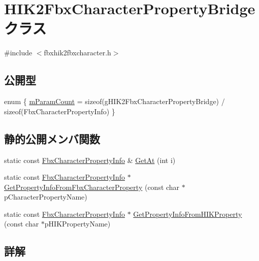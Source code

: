 \hypertarget{class_h_i_k2_fbx_character_property_bridge}{}\section{H\+I\+K2\+Fbx\+Character\+Property\+Bridge クラス}
\label{class_h_i_k2_fbx_character_property_bridge}


{\ttfamily \#include $<$fbxhik2fbxcharacter.\+h$>$}

\subsection*{公開型}
\begin{DoxyCompactItemize}
\item 
enum \{ \hyperlink{class_h_i_k2_fbx_character_property_bridge_ac10f28ca3e900cb0629889c0fd8bd87bac8e6c990d5975d6bf31634abcaff43f8}{m\+Param\+Count} = sizeof(g\+H\+I\+K2\+Fbx\+Character\+Property\+Bridge) / sizeof(Fbx\+Character\+Property\+Info)
 \}
\end{DoxyCompactItemize}
\subsection*{静的公開メンバ関数}
\begin{DoxyCompactItemize}
\item 
static const \hyperlink{class_fbx_character_property_info}{Fbx\+Character\+Property\+Info} \& \hyperlink{class_h_i_k2_fbx_character_property_bridge_ab3d905960717c287391f073b2e22c57f}{Get\+At} (int i)
\item 
static const \hyperlink{class_fbx_character_property_info}{Fbx\+Character\+Property\+Info} $\ast$ \hyperlink{class_h_i_k2_fbx_character_property_bridge_a43ed35a946a91d6face5b189b0f30754}{Get\+Property\+Info\+From\+Fbx\+Character\+Property} (const char $\ast$p\+Character\+Property\+Name)
\item 
static const \hyperlink{class_fbx_character_property_info}{Fbx\+Character\+Property\+Info} $\ast$ \hyperlink{class_h_i_k2_fbx_character_property_bridge_af240d0acf8c1577508d186132ef6011f}{Get\+Property\+Info\+From\+H\+I\+K\+Property} (const char $\ast$p\+H\+I\+K\+Property\+Name)
\end{DoxyCompactItemize}


\subsection{詳解}


